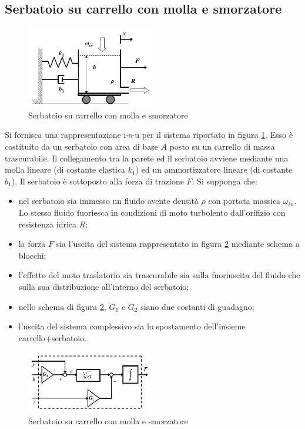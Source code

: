 \documentclass[a4paper]{report}
\begin{document}
\subsection{Serbatoio su carrello con molla e smorzatore}
\begin{figure}[!b]
  \centering
  \includegraphics[width=0.5\textwidth]{./images/esempio02.png}
  \caption{Serbatoio su carrello con molla e smorzatore\label{fig:esempio02}}
\end{figure}
Si fornisca una rappresentazione i-s-u per il sistema riportato in
figura \ref{fig:esempio02}. Esso \`e costituito da un serbatoio con area
di base $A$ posto su un carrello di massa trascurabile. Il
collegamento tra la parete ed il serbatoio avviene mediante una molla
lineare (di costante elastica $k_1$) ed un ammortizzatore lineare (di
costante $b_1$). Il serbatoio \`e sottoposto alla forza di trazione
$F$. Si supponga che:
\begin{itemize}
\item nel serbatoio sia immesso un fluido avente densit\`a $\rho$ con
  portata massica $\omega_{in}$. Lo stesso fluido fuoriesca in
  condizioni di moto turbolento dall'orifizio con resistenza idrica
  $R$;
\item la forza $F$ sia l'uscita del sistema rappresentato in
  figura \ref{fig:esempio02-2} mediante schema a blocchi;
\item l'effetto del moto traslatorio sia trascurabile sia sulla
  fuoriuscita del fluido che sulla sua distribuzione all'interno del
  serbatoio; 
\item nello schema di figura \ref{fig:esempio02-2}, $G_1$ e $G_2$ siano
  due costanti di guadagno;
\item l'uscita del sistema complessivo sia lo spostamento dell'insieme
  carrello+serbatoio.
\end{itemize}
\begin{figure}[!b]
  \centering
  \includegraphics[width=0.5\textwidth]{./images/esempio02-2.png}
  \caption{Serbatoio su carrello con molla e smorzatore\label{fig:esempio02-2}}
\end{figure}
\end{document}
